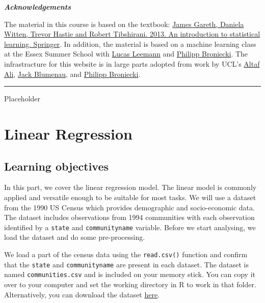 \documentclass[]{article}
\begin{document}
\textbf{\emph{Acknowledgements}}

The material in this course is based on the textbook: \href{http://faculty.marshall.usc.edu/gareth-james/ISL/ISLR\%20Seventh\%20Printing.pdf}{James Gareth, Daniela Witten, Trevor Hastie and Robert Tibshirani. 2013. An introduction to statistical learning. Springer}. In addition, the material is based on a machine learning class at the Essex Summer School with \href{https://lucasleemann.ch}{Lucas Leemann} and \href{https://philippbroniecki.com}{Philipp Broniecki}. The infrastracture for this website is in large parts adopted from work by UCL's \href{https://iris.ucl.ac.uk/iris/browse/profile?upi=ALIAX58}{Altaf Ali}, \href{https://www.jackblumenau.com/}{Jack Blumenau}, and \href{https://www.philippbroniecki.com/}{Philipp Broniecki}.

\begin{center}\rule{0.5\linewidth}{\linethickness}\end{center}

Placeholder

\hypertarget{linear-regression}{%
\section{Linear Regression}\label{linear-regression}}

\hypertarget{learning-objectives}{%
\subsection{Learning objectives}\label{learning-objectives}}

In this part, we cover the linear regression model. The linear model is commonly applied and versatile enough to be suitable for most tasks. We will use a dataset from the 1990 US Census which provides demographic and socio-economic data. The dataset includes observations from 1994 communities with each observation identified by a \texttt{state} and \texttt{communityname} variable. Before we start analysing, we load the dataset and do some pre-processing.

We load a part of the census data using the \texttt{read.csv()} function and confirm that the \texttt{state} and \texttt{communityname} are present in each dataset. The dataset is named \texttt{communities.csv} and is included on your memory stick. You can copy it over to your computer and set the working directory in R to work in that folder. Alternatively, you can download the dataset \href{http://philippbroniecki.github.io/ML2017.io/data/communities.csv}{here}.
\end{document}
